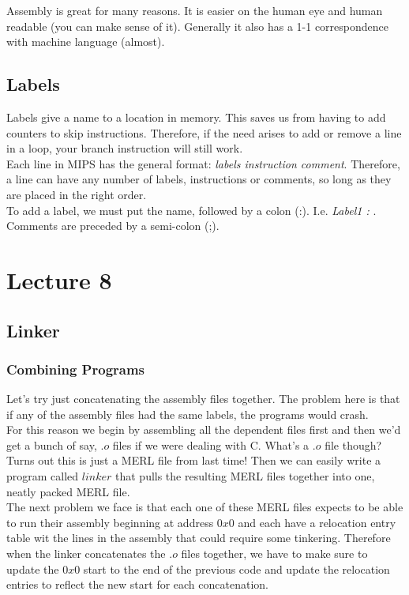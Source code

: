 \documentclass[12pt, twoside]{article}
\begin{document}
Assembly is great for many reasons.  It is easier on the human eye and human readable (you can make sense of it).  Generally it also has a 1-1 correspondence with machine language (almost). \\

\subsection{Labels}
Labels give a name to a location in memory.  This saves us from having to add counters to skip instructions.  Therefore, if the need arises to add or remove a line in a loop, your branch instruction will still work. \\

Each line in MIPS has the general format: \emph{labels instruction comment}.  Therefore, a line can have any number of labels, instructions or comments, so long as they are placed in the right order. \\

To add a label, we must put the name, followed by a colon (:).  I.e. \emph{Label1 : }.  Comments are preceded by a semi-colon (;). \\


\section{Lecture 8}

\subsection{Linker} 

\subsubsection{Combining Programs} 
Let's try just concatenating the assembly files together.  The problem here is that if any of the assembly files had the same labels,  the programs would crash.  \\

For this reason we begin by assembling all the dependent files first and then we'd get a bunch of say, $.o$ files if we were dealing with C.  What's a $.o$ file though?  Turns out this is just a MERL file from last time!  Then we can easily write a program called $linker$ that pulls the resulting MERL files together into one, neatly packed MERL file. \\

The next problem we face is that each one of these MERL files expects to be able to run their assembly beginning at address $0x0$ and each have a relocation entry table wit the lines in the assembly that could require some tinkering.  Therefore when the linker concatenates the $.o$ files together, we have to make sure to update the $0x0$ start to the end of the previous code and update the relocation entries to reflect the new start for each concatenation. \\
\end{document}
